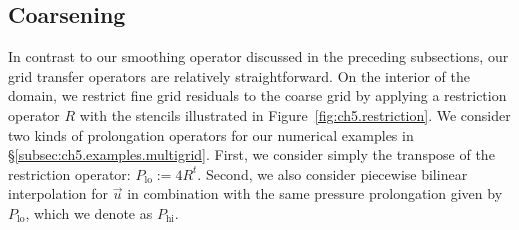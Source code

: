 \subsection{Coarsening} \label{subsec:ch5.multigrid.coarsening}

In contrast to our smoothing operator discussed in the preceding subsections, our grid transfer operators are relatively straightforward. On the interior of the domain, we restrict fine grid residuals to the coarse grid by applying a restriction operator $R$ with the stencils illustrated in Figure~\ref{fig:ch5.restriction}. We consider two kinds of prolongation operators for our numerical examples in \S\ref{subsec:ch5.examples.multigrid}. First, we consider simply the transpose of the restriction operator: $P_{\text{lo}} := 4 R^t$. Second, we also consider piecewise bilinear interpolation for $\vec{u}$ in combination with the same pressure prolongation given by $P_{\text{lo}}$, which we denote as $P_{\text{hi}}$.

